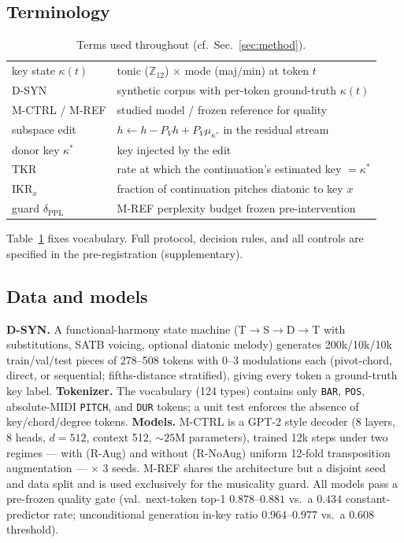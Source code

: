 \documentclass[conference]{IEEEtran}
\newcommand{\tkr}{\mathrm{TKR}}
\newcommand{\ikr}{\mathrm{IKR}}
\begin{document}
\subsection{Terminology}
\begin{table}[t]
\centering\small
\caption{Terms used throughout (cf.\ Sec.~\ref{sec:method}).}
\label{tab:terms}
\begin{tabular}{@{}ll@{}}
\toprule
key state $\kappa(t)$ & tonic ($\mathbb{Z}_{12}$) $\times$ mode (maj/min) at token $t$\\
D-SYN & synthetic corpus with per-token ground-truth $\kappa(t)$\\
M-CTRL / M-REF & studied model / frozen reference for quality\\
subspace edit & $h \leftarrow h - P_V h + P_V \mu_{\kappa^*}$ in the residual stream\\
donor key $\kappa^*$ & key injected by the edit\\
$\tkr$ & rate at which the continuation's estimated key $=\kappa^*$\\
$\ikr_x$ & fraction of continuation pitches diatonic to key $x$\\
guard $\delta_{\mathrm{PPL}}$ & M-REF perplexity budget frozen pre-intervention\\
\bottomrule
\end{tabular}
\end{table}
\label{sec:method}
Table~\ref{tab:terms} fixes vocabulary. Full protocol, decision rules, and
all controls are specified in the pre-registration (supplementary).

\subsection{Data and models}
\textbf{D-SYN.} A functional-harmony state machine
(T$\to$S$\to$D$\to$T with substitutions, SATB voicing, optional diatonic
melody) generates 200k/10k/10k train/val/test pieces of 278--508 tokens with
0--3 modulations each (pivot-chord, direct, or sequential; fifths-distance
stratified), giving every token a ground-truth key label. \textbf{Tokenizer.}
The vocabulary (124 types) contains only \texttt{BAR}, \texttt{POS},
absolute-MIDI \texttt{PITCH}, and \texttt{DUR} tokens; a unit test enforces
the absence of key/chord/degree tokens. \textbf{Models.} M-CTRL is a GPT-2
style decoder (8 layers, 8 heads, $d{=}512$, context 512, ${\sim}25$M
parameters), trained 12k steps under two regimes --- with (R-Aug) and without
(R-NoAug) uniform 12-fold transposition augmentation --- $\times$ 3 seeds.
M-REF shares the architecture but a
disjoint seed and data split and is used exclusively for the musicality
guard. All models pass a pre-frozen quality gate (val.\ next-token top-1
$0.878$--$0.881$ vs.\ a $0.434$ constant-predictor rate; unconditional
generation in-key ratio $0.964$--$0.977$ vs.\ a $0.608$ threshold).
\end{document}
